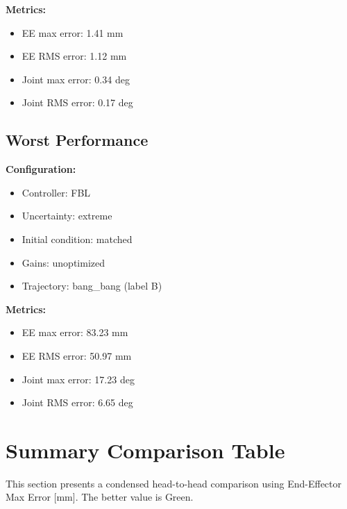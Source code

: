 \documentclass[11pt,a4paper]{article}
\begin{document}
\textbf{Metrics:}
\begin{itemize}
  \item EE max error: \textcolor{bestcolor}{1.41} mm
  \item EE RMS error: 1.12 mm
  \item Joint max error: 0.34 deg
  \item Joint RMS error: 0.17 deg
\end{itemize}

\subsection{Worst Performance}

\textbf{Configuration:}
\begin{itemize}
  \item Controller: FBL
  \item Uncertainty: extreme
  \item Initial condition: matched
  \item Gains: unoptimized
  \item Trajectory: bang\_bang (label B)
\end{itemize}

\textbf{Metrics:}
\begin{itemize}
  \item EE max error: \textcolor{worstcolor}{83.23} mm
  \item EE RMS error: 50.97 mm
  \item Joint max error: 17.23 deg
  \item Joint RMS error: 6.65 deg
\end{itemize}

\section{Summary Comparison Table}

This section presents a condensed head-to-head comparison using End-Effector Max Error [mm]. The better value is \textcolor{bestcolor}{Green}.
\end{document}
